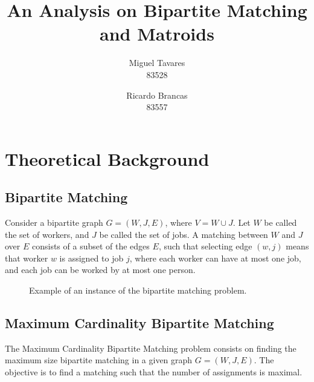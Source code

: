 \documentclass[a4,11pt]{article}
\title{An Analysis on Bipartite Matching and Matroids}
\author{Miguel Tavares \\ 83528 \and Ricardo Brancas \\ 83557 }
\date{}
\begin{document}
\maketitle

\section{Theoretical Background}

\subsection{Bipartite Matching}
Consider a bipartite graph $G = (W, J, E)$, where $V = W \cup J$. Let $W$ be called the set of workers, and $J$ be called the set of jobs. A matching between $W$ and $J$ over $E$ consists of a subset of the edges $E$, such that selecting edge $(w, j)$ means that worker $w$ is assigned to job $j$, where each worker can have at most one job, and each job can be worked by at most one person.

\begin{figure}[ht]
    \centering
    \caption{Example of an instance of the bipartite matching problem.}
\end{figure}


\subsection{Maximum Cardinality Bipartite Matching}
The Maximum Cardinality Bipartite Matching problem consists on finding the maximum size bipartite matching in a given graph $G = (W, J, E)$. The objective is to find a matching such that the number of assignments is maximal.
\end{document}
